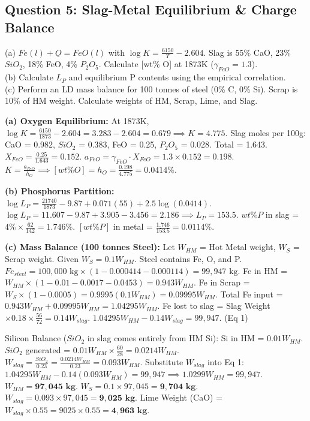 \documentclass[11pt,a4paper]{article}
\begin{document}
\subsection{Question 5: Slag-Metal Equilibrium \& Charge Balance}
\begin{questionbox}
(a) $Fe(l) + \underline{O} = FeO(l)$ with $\log K = \frac{6150}{T} - 2.604$. Slag is 55\% CaO, 23\% $SiO_2$, 18\% FeO, 4\% $P_2O_5$. Calculate [wt\% O] at 1873K ($\gamma_{FeO} = 1.3$). \\
(b) Calculate $L_P$ and equilibrium P contents using the empirical correlation. \\
(c) Perform an LD mass balance for 100 tonnes of steel (0\% C, 0\% Si). Scrap is 10\% of HM weight. Calculate weights of HM, Scrap, Lime, and Slag.
\end{questionbox}

\begin{solutionbox}
\textbf{(a) Oxygen Equilibrium:}
At 1873K, $\log K = \frac{6150}{1873} - 2.604 = 3.283 - 2.604 = 0.679 \implies K = 4.775$.
Slag moles per 100g: CaO = 0.982, $SiO_2$ = 0.383, FeO = 0.25, $P_2O_5$ = 0.028. Total = 1.643.
$X_{FeO} = \frac{0.25}{1.643} = 0.152$.
$a_{FeO} = \gamma_{FeO} \cdot X_{FeO} = 1.3 \times 0.152 = 0.198$.
$K = \frac{a_{FeO}}{h_O} \implies [wt\% O] = h_O = \frac{0.198}{4.775} = \mathbf{0.0414\%}$.

\textbf{(b) Phosphorus Partition:}
$\log L_P = \frac{21740}{1873} - 9.87 + 0.071(55) + 2.5 \log(0.0414)$.
$\log L_P = 11.607 - 9.87 + 3.905 - 3.456 = 2.186 \implies L_P = 153.5$.
$wt\% P$ in slag = $4\% \times \frac{62}{142} = 1.746\%$.
$[wt\% P]$ in metal = $\frac{1.746}{153.5} = \mathbf{0.0114\%}$.

\textbf{(c) Mass Balance (100 tonnes Steel):}
Let $W_{HM}$ = Hot Metal weight, $W_S$ = Scrap weight. Given $W_S = 0.1 W_{HM}$.
Steel contains Fe, O, and P.
$Fe_{steel} = 100,000 \text{ kg} \times (1 - 0.000414 - 0.000114) = 99,947 \text{ kg}$.
Fe in HM = $W_{HM} \times (1 - 0.01 - 0.0017 - 0.0453) = 0.943 W_{HM}$.
Fe in Scrap = $W_S \times (1 - 0.0005) = 0.9995 (0.1 W_{HM}) = 0.09995 W_{HM}$.
Total Fe input = $0.943 W_{HM} + 0.09995 W_{HM} = 1.04295 W_{HM}$.
Fe lost to slag = Slag Weight $\times 0.18 \times \frac{56}{72} = 0.14 W_{slag}$.
$1.04295 W_{HM} - 0.14 W_{slag} = 99,947$. (Eq 1)

Silicon Balance ($SiO_2$ in slag comes entirely from HM Si):
Si in HM = $0.01 W_{HM}$. $SiO_2$ generated = $0.01 W_{HM} \times \frac{60}{28} = 0.0214 W_{HM}$.
$W_{slag} = \frac{SiO_2}{0.23} = \frac{0.0214 W_{HM}}{0.23} = 0.093 W_{HM}$.
Substitute $W_{slag}$ into Eq 1:
$1.04295 W_{HM} - 0.14(0.093 W_{HM}) = 99,947 \implies 1.0299 W_{HM} = 99,947$.
$W_{HM} = \mathbf{97,045 \text{ kg}}$.
$W_S = 0.1 \times 97,045 = \mathbf{9,704 \text{ kg}}$.
$W_{slag} = 0.093 \times 97,045 = \mathbf{9,025 \text{ kg}}$.
Lime Weight (CaO) = $W_{slag} \times 0.55 = 9025 \times 0.55 = \mathbf{4,963 \text{ kg}}$.
\end{solutionbox}
\end{document}
